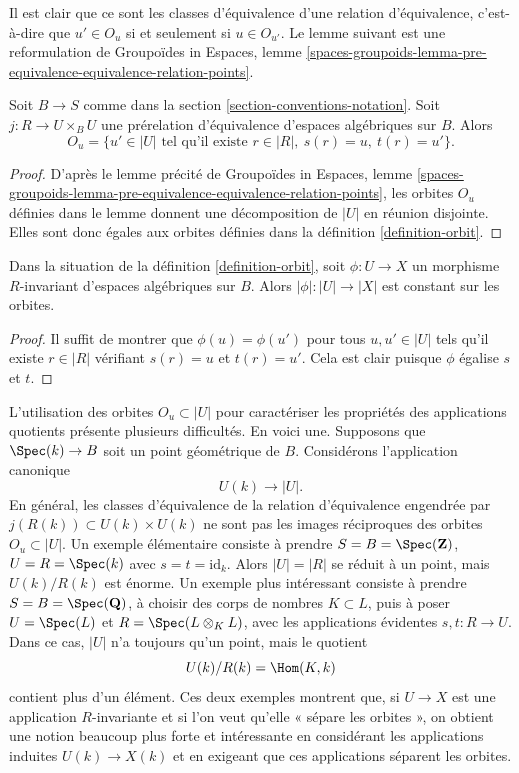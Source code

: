 \noindent
Il est clair que ce sont les classes d'équivalence d'une relation d'équivalence,
c'est-à-dire que $u' \in O_u$ si et seulement si $u \in O_{u'}$. Le lemme suivant
est une reformulation de
Groupoïdes in Espaces,
lemme \ref{spaces-groupoids-lemma-pre-equivalence-equivalence-relation-points}.

\begin{lemma}
\label{lemma-pre-equivalence-equivalence-relation-points}
Soit $B \to S$ comme dans la section \ref{section-conventions-notation}.
Soit $j : R \to U \times_B U$ une prérelation d'équivalence
d'espaces algébriques sur $B$. Alors
$$
O_u =
\{u' \in |U| \text{ tel qu'il existe } r \in |R|, \ s(r) = u, \ t(r) = u'\}.
$$
\end{lemma}

\begin{proof}
D'après le lemme précité de
Groupoïdes in Espaces,
lemme \ref{spaces-groupoids-lemma-pre-equivalence-equivalence-relation-points},
les orbites $O_u$ définies dans le lemme donnent une décomposition de
$|U|$ en réunion disjointe. Elles sont donc égales aux
orbites définies dans la définition \ref{definition-orbit}.
\end{proof}

\begin{lemma}
\label{lemma-invariant-map-constant-on-orbit}
Dans la situation de la définition \ref{definition-orbit},
soit $\phi : U \to X$ un morphisme $R$-invariant d'espaces algébriques sur
$B$. Alors $|\phi| : |U| \to |X|$ est constant sur les orbites.
\end{lemma}

\begin{proof}
Il suffit de montrer que $\phi(u) = \phi(u')$
pour tous $u, u' \in |U|$ tels qu'il existe
$r \in |R|$ vérifiant $s(r) = u$ et $t(r) = u'$.
Cela est clair puisque $\phi$ égalise $s$ et $t$.
\end{proof}

\noindent
L'utilisation des orbites $O_u \subset |U|$ pour caractériser les propriétés
des applications quotients présente plusieurs difficultés. En voici une.
Supposons que $\Spec(k) \to B$
soit un point géométrique de $B$. Considérons l'application canonique
$$
U(k) \longrightarrow |U|.
$$
En général, les classes d'équivalence
de la relation d'équivalence engendrée par $j(R(k)) \subset U(k) \times U(k)$
ne sont pas les images réciproques des orbites $O_u \subset |U|$.
Un exemple élémentaire consiste à prendre $S = B = \Spec(\mathbf{Z})$,
$U = R = \Spec(k)$ avec $s = t = \text{id}_k$. Alors $|U| = |R|$ se réduit
à un point, mais $U(k)/R(k)$ est énorme.
Un exemple plus intéressant consiste à prendre $S = B = \Spec(\mathbf{Q})$,
à choisir des corps de nombres $K \subset L$, puis à poser $U = \Spec(L)$
et $R = \Spec(L \otimes_K L)$, avec les applications évidentes $s, t : R \to U$.
Dans ce cas, $|U|$ n'a toujours qu'un point, mais le quotient
$$
U(k)/R(k) = \Hom(K, k)
$$
contient plus d'un élément. Ces deux exemples montrent
que, si $U \to X$ est une application $R$-invariante et si l'on veut qu'elle
« sépare les orbites », on obtient une notion beaucoup plus forte et intéressante en
considérant les applications induites $U(k) \to X(k)$ et en exigeant que
ces applications séparent les orbites.

